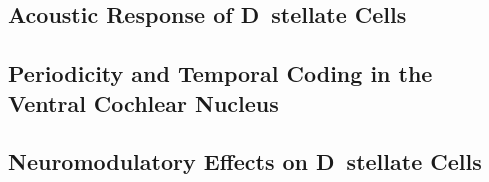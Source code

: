 \citep{FerragamoGoldingEtAl:1998a}


\subsection{Acoustic Response of D~stellate  Cells}







\subsection{Periodicity and Temporal Coding in the Ventral Cochlear Nucleus}






\subsection{Neuromodulatory Effects on D~stellate Cells}


